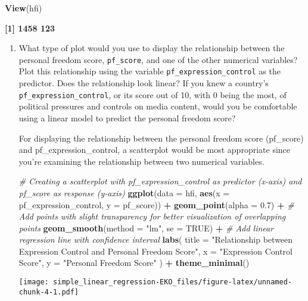 \documentclass[
]{article}
\newenvironment{Shaded}{\begin{snugshade}}{\end{snugshade}}
\newcommand{\AttributeTok}[1]{\textcolor[rgb]{0.13,0.29,0.53}{#1}}
\newcommand{\CommentTok}[1]{\textcolor[rgb]{0.56,0.35,0.01}{\textit{#1}}}
\newcommand{\ConstantTok}[1]{\textcolor[rgb]{0.56,0.35,0.01}{#1}}
\newcommand{\FloatTok}[1]{\textcolor[rgb]{0.00,0.00,0.81}{#1}}
\newcommand{\FunctionTok}[1]{\textcolor[rgb]{0.13,0.29,0.53}{\textbf{#1}}}
\newcommand{\NormalTok}[1]{#1}
\newcommand{\SpecialCharTok}[1]{\textcolor[rgb]{0.81,0.36,0.00}{\textbf{#1}}}
\newcommand{\StringTok}[1]{\textcolor[rgb]{0.31,0.60,0.02}{#1}}
\begin{document}
\begin{Shaded}
\begin{Highlighting}[]
\FunctionTok{View}\NormalTok{(hfi)}
\end{Highlighting}
\end{Shaded}

\textbf{{[}1{]} 1458 123}

\begin{enumerate}
\def\labelenumi{\arabic{enumi}.}
\setcounter{enumi}{1}
\item
  What type of plot would you use to display the relationship between
  the personal freedom score, \texttt{pf\_score}, and one of the other
  numerical variables? Plot this relationship using the variable
  \texttt{pf\_expression\_control} as the predictor. Does the
  relationship look linear? If you knew a country's
  \texttt{pf\_expression\_control}, or its score out of 10, with 0 being
  the most, of political pressures and controls on media content, would
  you be comfortable using a linear model to predict the personal
  freedom score?

  For displaying the relationship between the personal freedom score
  (pf\_score) and pf\_expression\_control, a scatterplot would be most
  appropriate since you're examining the relationship between two
  numerical variables.

\begin{Shaded}
\begin{Highlighting}[]
\CommentTok{\# Creating a scatterplot with pf\_expression\_control as predictor (x{-}axis) and pf\_score as response (y{-}axis)}
\FunctionTok{ggplot}\NormalTok{(}\AttributeTok{data =}\NormalTok{ hfi, }\FunctionTok{aes}\NormalTok{(}\AttributeTok{x =}\NormalTok{ pf\_expression\_control, }\AttributeTok{y =}\NormalTok{ pf\_score)) }\SpecialCharTok{+}
  \FunctionTok{geom\_point}\NormalTok{(}\AttributeTok{alpha =} \FloatTok{0.7}\NormalTok{) }\SpecialCharTok{+}  \CommentTok{\# Add points with slight transparency for better visualization of overlapping points}
  \FunctionTok{geom\_smooth}\NormalTok{(}\AttributeTok{method =} \StringTok{"lm"}\NormalTok{, }\AttributeTok{se =} \ConstantTok{TRUE}\NormalTok{) }\SpecialCharTok{+}  \CommentTok{\# Add linear regression line with confidence interval}
  \FunctionTok{labs}\NormalTok{(}
    \AttributeTok{title =} \StringTok{"Relationship between Expression Control and Personal Freedom Score"}\NormalTok{,}
    \AttributeTok{x =} \StringTok{"Expression Control Score"}\NormalTok{,}
    \AttributeTok{y =} \StringTok{"Personal Freedom Score"}
\NormalTok{  ) }\SpecialCharTok{+}
  \FunctionTok{theme\_minimal}\NormalTok{()}
\end{Highlighting}
\end{Shaded}

  \texttt{[image: simple\_linear\_regression-EKO\_files/figure-latex/unnamed-chunk-4-1.pdf]}
\end{enumerate}
\end{document}
